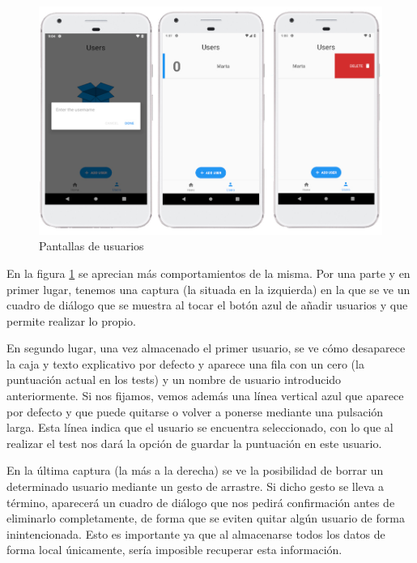 \begin{figure}[H]
	\centering
	\includegraphics[scale=0.4]{imagenes/capturas_usuarios.jpg}
	\caption{Pantallas de usuarios\label{fig:capturas_usuarios}}
\end{figure}

En la figura \ref{fig:capturas_usuarios} se aprecian más comportamientos de la misma. Por una parte y en primer lugar, tenemos una captura (la situada en la izquierda) en la que se ve un cuadro de diálogo que se muestra al tocar el botón azul de añadir usuarios y que permite realizar lo propio.

En segundo lugar, una vez almacenado el primer usuario, se ve cómo desaparece la caja y texto explicativo por defecto y aparece una fila con un cero (la puntuación actual en los tests) y un nombre de usuario introducido anteriormente. Si nos fijamos, vemos además una línea vertical azul que aparece por defecto y que puede quitarse o volver a ponerse mediante una pulsación larga. Esta línea indica que el usuario se encuentra seleccionado, con lo que al realizar el test nos dará la opción de guardar la puntuación en este usuario.

En la última captura (la más a la derecha) se ve la posibilidad de borrar un determinado usuario mediante un gesto de arrastre. Si dicho gesto se lleva a término, aparecerá un cuadro de diálogo que nos pedirá confirmación antes de eliminarlo completamente, de forma que se eviten quitar algún usuario de forma inintencionada. Esto es importante ya que al almacenarse todos los datos de forma local únicamente, sería imposible recuperar esta información.

